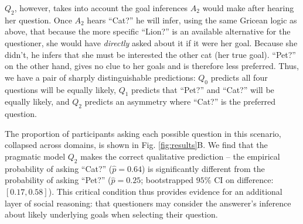 \documentclass[12pt, floatsintext, jou]{apa6}
\begin{document}
$Q_2$, however, takes into account the goal inferences $A_2$ would make after hearing her question. Once $A_2$ hears ``Cat?'' he will infer, using the same Gricean logic as above, that because the more specific ``Lion?'' is an available alternative for the questioner, she would have \emph{directly} asked about it if it were her goal. Because she didn't, he infers that she must be interested the other cat (her true goal). ``Pet?'' on the other hand, gives no clue to her goals and is therefore less preferred. Thus, we have a pair of sharply distinguishable predictions: $Q_0$ predicts all four questions will be equally likely, $Q_1$ predicts that ``Pet?'' and ``Cat?'' will be equally likely, and $Q_2$ predicts an asymmetry where ``Cat?'' is the preferred question.

%

The proportion of participants asking each possible question in this scenario, collapsed across domains, is shown in Fig. \ref{fig:results}B. We find that the pragmatic model $Q_2$ makes the correct qualitative prediction -- the empirical probability of asking ``Cat?'' ($\hat{p} = 0.64$) is significantly different from the  probability of asking ``Pet?'' ($\hat{p} = 0.25$; bootstrapped $95\%$ CI on difference: $[0.17, 0.58]$). This critical condition thus provides evidence for an additional layer of social reasoning: that questioners may consider the answerer's inference about likely underlying goals when selecting their question. 

%
\end{document}

